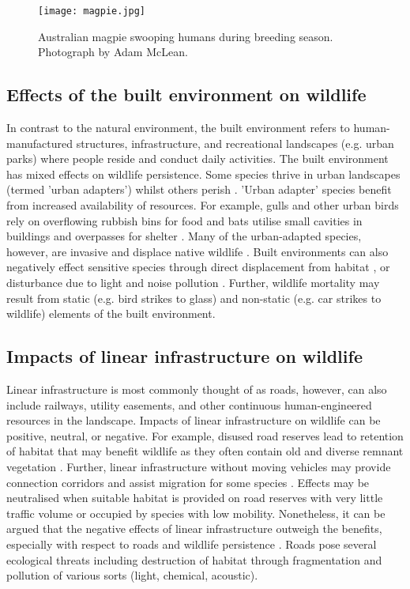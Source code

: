 \begin{figure*}[htp]
  \centering
  \texttt{[image: magpie.jpg]}
  \caption[Wildlife aggression towards humans]{Australian magpie swooping humans during breeding season. Photograph by Adam McLean.}
  \label{magpie}
\end{figure*}

\subsection{Effects of the built environment on wildlife}

In contrast to the natural environment, the built environment refers to human-manufactured structures, infrastructure, and recreational landscapes (e.g. urban parks) where people reside and conduct daily activities.  The built environment has mixed effects on wildlife persistence. Some species thrive in urban landscapes (termed 'urban adapters') whilst others perish \citep{shoc06}. 'Urban adapter' species benefit from increased availability of resources. For example, gulls and other urban birds rely on overflowing rubbish bins for food \citep{ditc06} and bats utilise small cavities in buildings and overpasses for shelter \citep{kunz82}. Many of the urban-adapted species, however, are invasive and displace native wildlife \citep{mcki06}. Built environments can also negatively effect sensitive species through direct displacement from habitat \citep{czec97}, or disturbance due to light and noise pollution \citep{parr16}. Further, wildlife mortality may result from static (e.g. bird strikes to glass) and non-static (e.g. car strikes to wildlife) elements of the built environment. 

\subsection{Impacts of linear infrastructure on wildlife}

Linear infrastructure is most commonly thought of as roads, however, can also include railways, utility easements, and other continuous human-engineered resources in the landscape. Impacts of linear infrastructure on wildlife can be positive, neutral, or negative. For example, disused road reserves lead to retention of habitat that may benefit wildlife as they often contain old and diverse remnant vegetation \citep{benn91}. Further, linear infrastructure without moving vehicles may provide connection corridors and assist migration for some species \citep{rvdr15}. Effects may be neutralised when suitable habitat is provided on road reserves with very little traffic volume or occupied by species with low mobility. Nonetheless, it can be argued that the negative effects of linear infrastructure outweigh the benefits, especially with respect to roads and wildlife persistence \citep{fahr09}. Roads pose several ecological threats including destruction of habitat through fragmentation and pollution of various sorts (light, chemical, acoustic).

